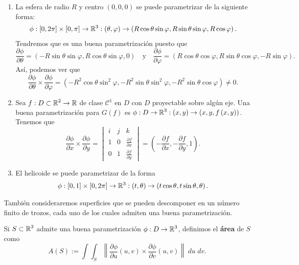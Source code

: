 \begin{eg}
\begin{enumerate}
\item La esfera de radio $\displaystyle R $ y centro $\displaystyle \left(0,0,0\right) $ se puede parametrizar de la siguiente forma:
	\[\phi : \left[0,2\pi \right] \times \left[0, \pi \right] \to \mathbb{R}^{3} : \left(\theta, \varphi\right) \to \left(R \cos \theta \sin\varphi, R \sin \theta \sin\varphi, R \cos\varphi\right) .\]
Tendremos que es una buena parametrización puesto que 
\[\frac{\partial \phi}{\partial \theta}=\left(-R\sin\theta\sin\varphi, R\cos\theta\sin\varphi, 0\right)\quad \text{y} \quad \frac{\partial \phi}{\partial \varphi} =\left(R\cos\theta \cos\varphi, R \sin \theta \cos\varphi, -R\sin\varphi\right).\]
Así, podemos ver que
\[\frac{\partial \phi}{\partial \theta }\times \frac{\partial \phi}{\partial \varphi}=\left(-R^{2}\cos \theta \sin ^{2}\varphi, - R^{2}\sin \theta \sin ^{2}\varphi, - R^{2}\sin \theta \cos \varphi\right) \neq 0 .\]
\item Sea $\displaystyle f : D \subset \mathbb{R}^{2}\to \mathbb{R} $ de clase $\displaystyle \mathcal{C}^{1} $ en $\displaystyle D $ con $\displaystyle D $ proyectable sobre algún eje. Una buena parametrización para $\displaystyle G\left(f\right) $ es $\displaystyle \phi : D \to \mathbb{R}^{3} : \left(x,y\right)\to \left(x,y,f\left(x,y\right)\right) $. Tenemos que 
	\[\frac{\partial \phi}{\partial x}\times \frac{\partial \phi}{\partial y}=\begin{vmatrix} i & j & k \\ 1 & 0 & \frac{\partial f}{\partial x} \\ 0 & 1 & \frac{\partial f}{\partial y} \end{vmatrix} =\left(-\frac{\partial f}{\partial x}, - \frac{\partial f}{\partial y}, 1\right) .\]
\item El helicoide se puede parametrizar de la forma 
	\[\phi: \left[0,1\right] \times\left[0, 2\pi \right] \to \mathbb{R}^{3} : \left(t, \theta \right)\to \left(t\cos\theta, t \sin \theta, \theta \right) .\]
\end{enumerate}
\end{eg}
\begin{observation}
También consideraremos superficies que se pueden descomponer en un número finito de trozos, cada uno de los cuales admiten una buena parametrización.
\end{observation}
\begin{definition}
Si $\displaystyle S \subset \mathbb{R}^{3} $ admite una buena parametrización $\displaystyle \phi: D \to \mathbb{R}^{3} $, definimos el \textbf{área} de $\displaystyle S $ como 
\[A\left(S\right):=\int \int _{S}\left\|\frac{\partial \phi}{\partial u}\left(u,v\right) \times \frac{\partial\phi}{\partial v}\left(u,v\right)\right\| \; du \; dv .\]
\end{definition}
